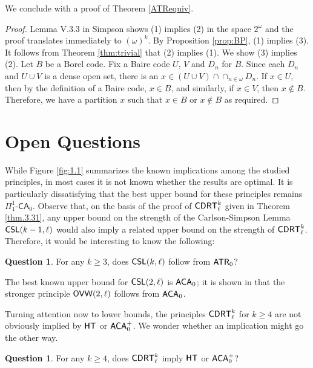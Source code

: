 \documentclass{amsart}
\theoremstyle{definition}
\newtheorem{question}[thm]{Question}
\theoremstyle{remark}
\newcommand{\system}[1]{\mbox{\fontfamily{cmss}\fontshape{n}\fontseries{m}%
    \selectfont#1}}
\newcommand{\ACA}{\system{ACA}\ensuremath{_0}}
\newcommand{\ATR}{\system{ATR}\ensuremath{_0}}
\newcommand{\CDRT}{\system{CDRT}}
\newcommand{\cDRT}{\system{CDRT}}
\newcommand{\CSL}{\system{CSL}}
\newcommand{\OVW}{\system{OVW}}
\newcommand{\HT}{\system{HT}}
\begin{document}
We conclude with a proof of Theorem \ref{ATRequiv}. 

\begin{proof}
Lemma V.3.3 in Simpson \cite{sosa} shows (1) implies (2) in the space $2^{\omega}$ and the proof translates immediately to $(\omega)^k$. By Proposition \ref{prop:BP}, 
(1) implies (3). It follows from Theorem \ref{thm:trivial} that (2) implies (1). We show (3) implies (2). Let $B$ be a Borel code. Fix a Baire code  
$U$, $V$ and $D_n$ for $B$. Since each $D_n$ and $U \cup V$ is a dense open set, there is an $x \in (U \cup V) \cap \cap_{n \in \omega} D_n$. 
If $x \in U$, then by the definition of a Baire code, $x \in B$, and similarly, if $x \in V$, then $x \not \in B$. Therefore, we have a partition $x$ such that $x \in B$ or 
$x \not \in B$ as required. 
\end{proof}



\section{Open Questions}\label{sec:open}

While Figure \ref{fig:1.1} summarizes the known implications 
among the studied principles, in most cases it is not known 
whether the results are optimal.  It is particularly 
dissatisfying that the best upper bound for these principles 
remains $\Pi^1_1$-$\mathsf{CA}_0$.  Observe 
that, on the basis of the proof of $\CDRT^k_\ell$ given 
in Theorem \ref{thm.3.31}, any upper bound on the strength 
of the Carlson-Simpson Lemma $\CSL({k-1},\ell)$ would also
imply a related upper bound on the strength of $\CDRT^k_\ell$.
Therefore, it would be interesting to know the following:

\begin{question}
For any $k\geq 3$, does $\CSL(k,\ell)$ follow from $\ATR$?
\end{question}

The best known upper bound for $\CSL(2,\ell)$ is $\ACA$; it is 
shown in \cite{LiuMoninPatey} that the stronger principle 
$\OVW(2,\ell)$ follows from $\ACA$.  

Turning attention now to lower bounds, the principles 
$\CDRT^k_\ell$ for $k\geq 4$
 are not obviously implied by $\HT$ or 
$\ACA^+$.  We wonder whether an implication might go the 
other way.

\begin{question}
For any $k\geq 4$, does $\cDRT^k_\ell$ imply $\HT$ or $\ACA^+$?
\end{question}
\end{document}
